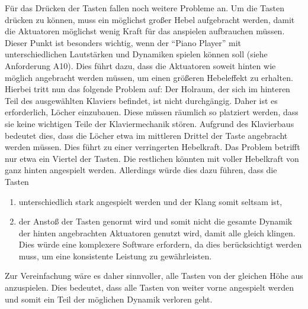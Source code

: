 Für das Drücken der Tasten fallen noch weitere Probleme an. Um die Tasten drücken zu können, muss ein möglichst großer
Hebel aufgebracht werden, damit die Aktuatoren möglichst wenig Kraft für das anspielen aufbrauchen müssen.
Dieser Punkt ist besonders wichtig, wenn der \enquote{Piano Player} mit unterschiedlichen Lautstärken und Dynamiken spielen können soll (siehe Anforderung A10).
Dies führt dazu, dass die Aktuatoren soweit hinten wie möglich angebracht werden müssen, um einen größeren Hebeleffekt zu erhalten.
\newline
Hierbei tritt nun das folgende Problem auf:
Der Holraum, der sich im hinteren Teil des ausgewählten Klaviers befindet, ist nicht durchgängig. Daher ist es
erforderlich, Löcher einzubauen. Diese müssen räumlich so platziert werden, dass sie keine wichtigen Teile der Klaviermechanik
stören. Aufgrund des Klavierbaus bedeutet dies, dass die Löcher etwa im mittleren Drittel der Taste angebracht werden müssen.
Dies führt zu einer verringerten Hebelkraft. Das Problem betrifft nur etwa ein Viertel der Tasten. Die restlichen könnten mit
voller Hebelkraft von ganz hinten angespielt werden. Allerdings würde dies dazu führen, dass die Tasten
\begin{enumerate}
	\item unterschiedlich stark angespielt werden und der Klang somit seltsam ist,
	\item der Anstoß der Tasten genormt wird und somit nicht die gesamte Dynamik der hinten angebrachten Aktuatoren genutzt
	wird, damit alle gleich klingen. Dies würde eine komplexere Software erfordern, da dies berücksichtigt werden muss, um eine
	konsistente Leistung zu gewährleisten.
\end{enumerate}
Zur Vereinfachung wäre es daher sinnvoller, alle Tasten von der gleichen Höhe aus anzuspielen. Dies bedeutet, dass alle
Tasten von weiter vorne angespielt werden und somit ein Teil der möglichen Dynamik verloren geht. \newline

